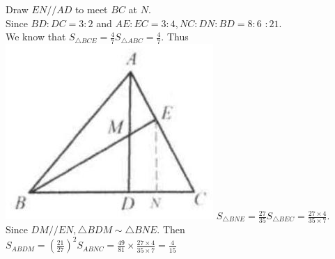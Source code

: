 \documentclass{article}
\begin{document}
Draw \(E N / / A D\) to meet \(B C\) at \(N\).\\
Since \(B D: D C=3: 2\) and \(A E: E C=3: 4, N C: D N: B D=8: 6\) \(: 21\).\\
We know that \(S_{\triangle B C E}=\frac{4}{7} S_{\triangle A B C}=\frac{4}{7}\). Thus\\
\includegraphics[width=\textwidth]{images/reasoning_image_1.jpg} \(S_{\triangle B N E}=\frac{27}{35} S_{\triangle B E C}=\frac{27 \times 4}{35 \times 7}\).\\
Since \(D M / / E N, \triangle B D M \sim \triangle B N E\). Then \(S_{A B D M}=\left(\frac{21}{27}\right)^{2} S_{A B N C}=\frac{49}{81} \times \frac{27 \times 4}{35 \times 7}=\frac{4}{15}\)\\
\end{document}
